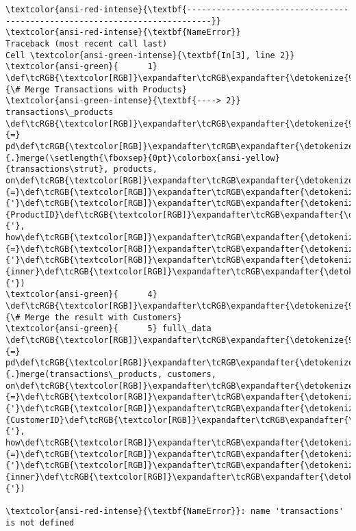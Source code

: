 \documentclass[11pt]{article}
\begin{document}
    \begin{Verbatim}[commandchars=\\\{\}, frame=single, framerule=2mm, rulecolor=\color{outerrorbackground}]
\textcolor{ansi-red-intense}{\textbf{---------------------------------------------------------------------------}}
\textcolor{ansi-red-intense}{\textbf{NameError}}                                 Traceback (most recent call last)
Cell \textcolor{ansi-green-intense}{\textbf{In[3], line 2}}
\textcolor{ansi-green}{      1} \def\tcRGB{\textcolor[RGB]}\expandafter\tcRGB\expandafter{\detokenize{95,135,135}}{\# Merge Transactions with Products}
\textcolor{ansi-green-intense}{\textbf{----> 2}} transactions\_products \def\tcRGB{\textcolor[RGB]}\expandafter\tcRGB\expandafter{\detokenize{98,98,98}}{=} pd\def\tcRGB{\textcolor[RGB]}\expandafter\tcRGB\expandafter{\detokenize{98,98,98}}{.}merge(\setlength{\fboxsep}{0pt}\colorbox{ansi-yellow}{transactions\strut}, products, on\def\tcRGB{\textcolor[RGB]}\expandafter\tcRGB\expandafter{\detokenize{98,98,98}}{=}\def\tcRGB{\textcolor[RGB]}\expandafter\tcRGB\expandafter{\detokenize{175,0,0}}{'}\def\tcRGB{\textcolor[RGB]}\expandafter\tcRGB\expandafter{\detokenize{175,0,0}}{ProductID}\def\tcRGB{\textcolor[RGB]}\expandafter\tcRGB\expandafter{\detokenize{175,0,0}}{'}, how\def\tcRGB{\textcolor[RGB]}\expandafter\tcRGB\expandafter{\detokenize{98,98,98}}{=}\def\tcRGB{\textcolor[RGB]}\expandafter\tcRGB\expandafter{\detokenize{175,0,0}}{'}\def\tcRGB{\textcolor[RGB]}\expandafter\tcRGB\expandafter{\detokenize{175,0,0}}{inner}\def\tcRGB{\textcolor[RGB]}\expandafter\tcRGB\expandafter{\detokenize{175,0,0}}{'})
\textcolor{ansi-green}{      4} \def\tcRGB{\textcolor[RGB]}\expandafter\tcRGB\expandafter{\detokenize{95,135,135}}{\# Merge the result with Customers}
\textcolor{ansi-green}{      5} full\_data \def\tcRGB{\textcolor[RGB]}\expandafter\tcRGB\expandafter{\detokenize{98,98,98}}{=} pd\def\tcRGB{\textcolor[RGB]}\expandafter\tcRGB\expandafter{\detokenize{98,98,98}}{.}merge(transactions\_products, customers, on\def\tcRGB{\textcolor[RGB]}\expandafter\tcRGB\expandafter{\detokenize{98,98,98}}{=}\def\tcRGB{\textcolor[RGB]}\expandafter\tcRGB\expandafter{\detokenize{175,0,0}}{'}\def\tcRGB{\textcolor[RGB]}\expandafter\tcRGB\expandafter{\detokenize{175,0,0}}{CustomerID}\def\tcRGB{\textcolor[RGB]}\expandafter\tcRGB\expandafter{\detokenize{175,0,0}}{'}, how\def\tcRGB{\textcolor[RGB]}\expandafter\tcRGB\expandafter{\detokenize{98,98,98}}{=}\def\tcRGB{\textcolor[RGB]}\expandafter\tcRGB\expandafter{\detokenize{175,0,0}}{'}\def\tcRGB{\textcolor[RGB]}\expandafter\tcRGB\expandafter{\detokenize{175,0,0}}{inner}\def\tcRGB{\textcolor[RGB]}\expandafter\tcRGB\expandafter{\detokenize{175,0,0}}{'})

\textcolor{ansi-red-intense}{\textbf{NameError}}: name 'transactions' is not defined
    \end{Verbatim}
\end{document}
